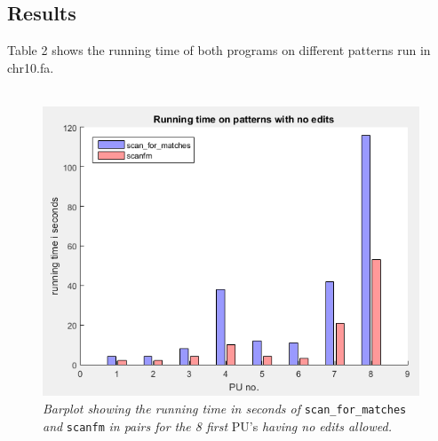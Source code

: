 \documentclass[12pt]{article}
\newcommand{\scm}{\texttt{scan\_for\_matches} }
\newcommand{\sfm}{\texttt{scanfm} }
\newcommand{\pus}{PU's }
\begin{document}
\subsection{Results}
Table 2 shows the running time of both programs on different patterns run in chr10.fa. \\ \\
\begin{figure}[H]
\begin{center}
\includegraphics[scale=1.05]{Diagrams/barplot.png}
\end{center}
\caption{\textit{Barplot showing the running time in seconds of} \scm \textit{and} \sfm \textit{in pairs 
for the 8 first} \pus \textit{having no edits allowed.}}
\end{figure}
\end{document}
